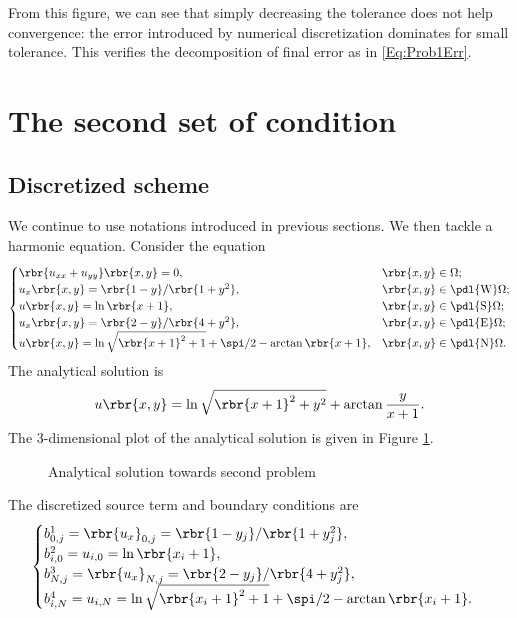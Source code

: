 \documentclass[english, nochinese]{pnote}
\begin{document}
From this figure, we can see that simply decreasing the tolerance does not help convergence: the error introduced by numerical discretization dominates for small tolerance. This verifies the decomposition of final error as in \eqref{Eq:Prob1Err}.

\section{The second set of condition}

\subsection{Discretized scheme}

We continue to use notations introduced in previous sections. We then tackle a harmonic equation. Consider the equation
\begin{equation}
\begin{cases}
\rbr{ u_{ x x } + u_{ y y } } \rbr{ x, y } = 0, & \rbr{ x, y } \in \Omega; \\
u_x \rbr{ x, y } = \rbr{ 1 - y } / \rbr{ 1 + y^2 }, & \rbr{ x, y } \in \pdl{\text{W}} \Omega; \\
u \rbr{ x, y } = \ln \rbr{ x + 1 }, & \rbr{ x, y } \in \pdl{\text{S}} \Omega; \\
u_x \rbr{ x, y } = \rbr{ 2 - y } / \rbr{ 4 + y^2 }, & \rbr{ x, y } \in \pdl{\text{E}} \Omega; \\
u \rbr{ x, y } = \ln \sqrt{ \rbr{ x + 1 }^2 + 1 } + \spi / 2 - \arctan \rbr{ x + 1 }, & \rbr{ x, y } \in \pdl{\text{N}} \Omega.
\end{cases}
\end{equation}
The analytical solution is
\begin{equation}
u \rbr{ x, y } = \ln \sqrt{ \rbr{ x + 1 }^2 + y^2 } + \arctan \frac{y}{ x + 1 }.
\end{equation}
The 3-dimensional plot of the analytical solution is given in Figure \ref{Fig:Prob23D}.
\begin{figure}[htbp]
\centering

\caption{Analytical solution towards second problem}
\label{Fig:Prob23D}
\end{figure}
The discretized source term and boundary conditions are
\begin{gather}
\begin{cases}
b^1_{ 0, j } = \rbr{u_x}_{ 0, j } = \rbr{ 1 - y_j } / \rbr{ 1 + y_j^2 }, \\
b^2_{ i, 0 } = u_{ i, 0 } = \ln \rbr{ x_i + 1 }, \\
b^3_{ N, j } = \rbr{u_x}_{ N, j } = \rbr{ 2 - y_j } / \rbr{ 4 + y_j^2 }, \\
b^4_{ i, N } = u_{ i, N } = \ln \sqrt{ \rbr{ x_i + 1 }^2 + 1 } + \spi / 2 - \arctan \rbr{ x_i + 1 }.
\end{cases}
\end{gather}
\end{document}
